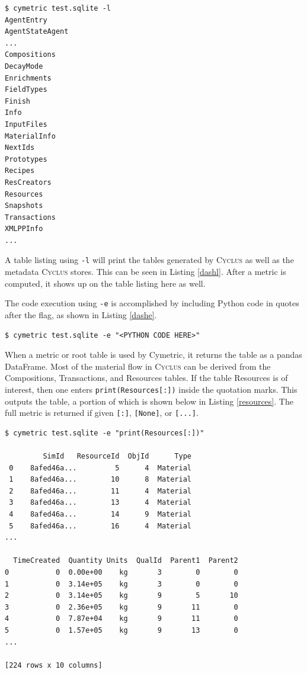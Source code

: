 \documentclass{anstrans}
\newcommand{\cyclus}{\textsc{Cyclus}\xspace}
\newcommand{\code}[1]{{\color{code}\texttt{#1}}}
\begin{document}
\begin{lstlisting}[caption ={List of Tables in a Database}, label=dashl]
$ cymetric test.sqlite -l
AgentEntry
AgentStateAgent
...
Compositions
DecayMode
Enrichments
FieldTypes
Finish
Info
InputFiles
MaterialInfo
NextIds
Prototypes
Recipes
ResCreators
Resources
Snapshots
Transactions
XMLPPInfo
...
\end{lstlisting} 


A table listing using \code{-l} will print the tables generated by \cyclus 
as well as the metadata \cyclus stores. This can be seen in Listing 
\ref{dashl}. After a metric is computed, it shows up on the table 
listing here as well. 

The code execution using \code{-e} is accomplished by including 
Python code in quotes after the flag, as shown in Listing \ref{dashe}. 

\begin{lstlisting}[caption ={Executing Code on a Database}, label=dashe]
$ cymetric test.sqlite -e "<PYTHON CODE HERE>"
\end{lstlisting} 

When a metric or root table is used by Cymetric, it returns the table 
as a pandas DataFrame. \cite{pandas0.15.2} Most of the material flow in 
\cyclus can be derived from the Compositions, Transactions, and Resources 
tables. If the table Resources is of interest, 
then one enters \code{print(Resources[:])} inside the quotation marks. 
This outputs the table, a portion of which is shown below in Listing 
\ref{resources}. The full metric is returned if given \code{[:]}, 
\code{[None]}, or \code{[...]}. 

\begin{lstlisting}[caption={Printing a Root Table}, label=resources]
$ cymetric test.sqlite -e "print(Resources[:])"

         SimId   ResourceId  ObjId      Type  
 0    8afed46a...         5      4  Material   
 1    8afed46a...        10      8  Material   
 2    8afed46a...        11      4  Material   
 3    8afed46a...        13      4  Material   
 4    8afed46a...        14      9  Material   
 5    8afed46a...        16      4  Material   
...

  TimeCreated  Quantity Units  QualId  Parent1  Parent2  
0           0  0.00e+00    kg       3        0        0  
1           0  3.14e+05    kg       3        0        0  
2           0  3.14e+05    kg       9        5       10  
3           0  2.36e+05    kg       9       11        0  
4           0  7.87e+04    kg       9       11        0  
5           0  1.57e+05    kg       9       13        0  
...

[224 rows x 10 columns]
\end{lstlisting}
\end{document}
